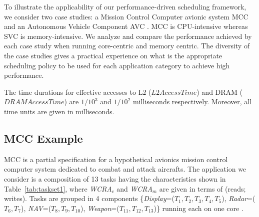 \label{sec:casestudy}
To illustrate the applicability of our performance-driven scheduling framework, we consider two case studies: a Mission Control Computer avionic system MCC \cite{Locke91} and an Autonomous Vehicle Component AVC \cite{HyoseungData14}. MCC is CPU-intensive whereas SVC is memory-intensive. We analyze and compare the performance achieved by each case study when running core-centric and memory centric. The diversity of the case studies gives a practical experience on what is the appropriate scheduling policy to be used for each application category to achieve high performance. 


The time durations for effective accesses to L2 ($L2AccessTime$) and DRAM ($DRAMAccessTime$) are $1/10^3$ and $1/10^2$ milliseconds respectively. Moreover, all time units are given in milliseconds. 

\subsection{MCC Example}
MCC is a partial specification for a hypothetical avionics mission control computer system dedicated to combat and attack
aircrafts. The application we consider is a composition of 13 tasks having the characteristics shown in Table~\ref{tab:taskset1}, where \emph{WCRA}$_c$ and \emph{WCRA}$_m$ are given in terms of (reads; writes). Tasks are grouped in 4 components \{\emph{Display}=($T_1,T_2,T_3,T_4,T_5$), \emph{Radar}=($T_6,T_7$), \emph{{NAV}}=($T_8,T_9,T_{10}$), \emph{Weapon}=($T_{11},T_{12},T_{13}$)\} running each on one core \cite{Boudjadar15}. 


